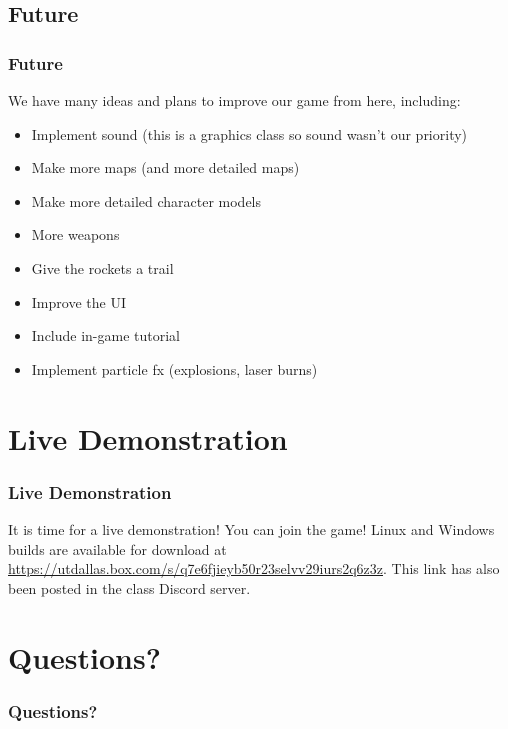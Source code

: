 \documentclass{beamer}
\begin{document}
\subsection{Future}
\begin{frame}
\frametitle{Future}
We have many ideas and plans to improve our game from here, including:
    \begin{itemize}
        \item Implement sound (this is a graphics class so sound wasn't our priority)
        \item Make more maps (and more detailed maps)
        \item Make more detailed character models
        \item More weapons
        \item Give the rockets a trail 🚀
        \item Improve the UI
        \item Include in-game tutorial
        \item Implement particle fx (explosions, laser burns)
    \end{itemize}

\end{frame}

\section{Live Demonstration}

\begin{frame}
\frametitle{Live Demonstration}
    It is time for a live demonstration! You can join the game! Linux and Windows builds are available for download at \href{https://utdallas.box.com/s/q7e6fjieyb50r23selvv29iurs2q6z3z}{https://utdallas.box.com/s/q7e6fjieyb50r23selvv29iurs2q6z3z}. This link has also been posted in the class Discord server.
\end{frame}

\section{Questions?}

\begin{frame}
\frametitle{Questions?}
\end{frame}
\end{document}
